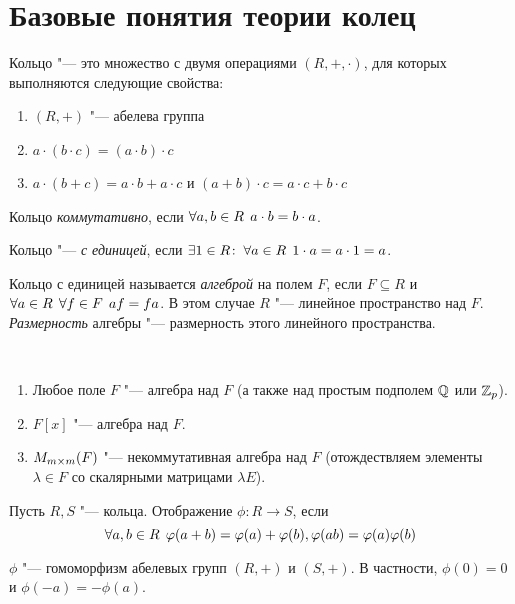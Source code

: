 \documentclass[main]{subfiles}
\begin{document}
\section{Базовые понятия теории колец}
\begin{definition}
  Кольцо "--- это множество с двумя операциями
  \( (R, +, \cdot) \), для которых выполняются
  следующие свойства:
  \begin{enumerate}
    \item \( (R, +) \) "--- абелева группа
    \item \( a \cdot (b \cdot c) = (a \cdot b) \cdot c \)
    \item \( a \cdot (b + c) = a \cdot b + a \cdot c \) и
      \( (a + b) \cdot c = a \cdot c + b \cdot c \)
  \end{enumerate}

  Кольцо \emph{коммутативно}, если
  \( \forall {a, b \in R} \; \, a \cdot b = b \cdot a \).

  Кольцо "--- \emph{с единицей}, если
  \( \exists 1 \in R \colon \: \forall {a \in R} \; \, 1 \cdot a = a \cdot 1 = a \).
\end{definition}

\begin{definition}
  Кольцо с единицей называется
  \emph{алгеброй} на полем \( F \),
  если \( F \subseteq R \) и
  \( \forall {a \in R} \; \, \forall {f \in F} \; \, af = fa \).
  В этом случае \( R \) "--- линейное пространство
  над \( F \).
  \emph{Размерность} алгебры "--- размерность этого
  линейного пространства.
\end{definition}

\begin{examples}~
  \begin{enumerate}
    \item Любое поле \( F \) "--- алгебра над
      \( F \) (а также над простым подполем
      \( \mathbb{Q} \) или \( \mathbb{Z}_p \)).
    \item \( F[x] \) "--- алгебра над \( F \).
    \item \( \Matrices[F]{m}{m} \) "---
      некоммутативная алгебра над \( F \)
      (отождествляем элементы \( \lambda \in F \)
      со скалярными матрицами \( \lambda E \)).
  \end{enumerate}
\end{examples}

\begin{definition}
  Пусть \( R, S \) "--- кольца. Отображение
  \( \phi : R \to S \), если
  \[
    \forall {a, b \in R} \; \, \varphi(a + b) = \varphi(a) + \varphi(b),
    \varphi(ab) = \varphi(a) \varphi(b)
  \]
\end{definition}
\begin{remark}
  \( \phi \) "--- гомоморфизм абелевых групп
  \( (R, +) \) и \( (S, +) \). В частности,
  \( \phi(0) = 0 \) и \( \phi(-a) = -\phi(a) \).
\end{remark}
\end{document}
